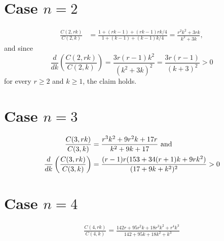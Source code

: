\documentclass[12pt]{article}
\newcommand{\Le}{\left(}
\newcommand{\Ri}{\right)}
\begin{document}
\section{Case $n = 2$}
\begin{align*}
\frac{C(2,rk)}{C(2,k)} &= \frac{1 + (rk-1) + (rk-1)rk/4}{1 + (k-1) + (k-1)k/4}
= \frac{r^2k^2 + 3rk}{k^2 + 3k},
\end{align*}and since
$$
\frac{d}{dk} \Le\frac{C(2,rk)}{C(2,k)} \Ri =\frac{3r(r-1)k^2}{(k^2+3k)^2} = \frac{3r(r-1)}{(k+3)^2} > 0
$$for every $r \geq 2$ and $k \geq 1$, the claim holds.

\section{Case $n = 3$}
\begin{align*}
\frac{C(3,rk)}{C(3,k)} &= \frac{r^3k^2 + 9r^2k + 17r}{k^2 + 9k + 17} \textnormal{ and } \\ \frac{d}{dk} \Le\frac{C(3,rk)}{C(3,k)}\Ri &= \frac{(r-1)r(153 + 34 (r+1) k + 9 r k^2)}{(17 + 9 k + k^2)^2} > 0
\end{align*}

\section{Case $n = 4$}
\begin{align*}
\frac{C(4,rk)}{C(4,k)} = \frac{142 r + 95 r^2 k + 18 r^3 k^2 + r^4 k^3}{142 + 95 k + 18 k^2 + k^3}
\end{align*}
\end{document}
